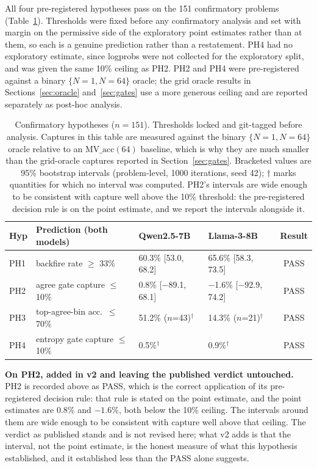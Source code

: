 \documentclass{article}
\begin{document}
All four pre-registered hypotheses pass on the 151 confirmatory problems
(Table~\ref{tab:confirmatory}). Thresholds were fixed before any confirmatory
analysis and set with margin on the permissive side of the exploratory point
estimates rather than at them, so each is a genuine prediction rather than a
restatement. PH4 had no exploratory estimate, since logprobs were not collected
for the exploratory split, and was given the same 10\% ceiling as PH2.
PH2 and PH4 were pre-registered against a binary $\{N=1, N=64\}$ oracle; the
grid oracle results in Sections~\ref{sec:oracle} and~\ref{sec:gates} use a
more generous ceiling and are reported separately as post-hoc analysis.

\begin{table}[t]
\begin{center}
\begin{tabular}{llllc}
\toprule
\textbf{Hyp} & \textbf{Prediction (both models)} & \textbf{Qwen2.5-7B} & \textbf{Llama-3-8B} & \textbf{Result} \\
\midrule
PH1 & backfire rate $\geq$ 33\%          & 60.3\% [53.0, 68.2] & 65.6\% [58.3, 73.5] & PASS \\
PH2 & agree gate capture $\leq$ 10\%   & 0.8\% [$-$89.1, 68.1] & $-$1.6\% [$-$92.9, 74.2] & PASS \\
PH3 & top-agree-bin acc.\ $\leq$ 70\%  & 51.2\% ($n$=43)$^{\dagger}$ & 14.3\% ($n$=21)$^{\dagger}$ & PASS \\
PH4 & entropy gate capture $\leq$ 10\% & 0.5\%$^{\dagger}$    & 0.9\%$^{\dagger}$      & PASS \\
\bottomrule
\end{tabular}
\end{center}
\caption{Confirmatory hypotheses ($n=151$). Thresholds locked and git-tagged
before analysis. Captures in this table are measured against the binary
$\{N=1, N=64\}$ oracle relative to an $\text{MV\_acc}(64)$ baseline, which is
why they are much smaller than the grid-oracle captures reported in
Section~\ref{sec:gates}. Bracketed values are 95\% bootstrap intervals
(problem-level, 1000 iterations, seed 42); $\dagger$ marks quantities for which
no interval was computed. PH2's intervals are wide enough to be consistent with
capture well above the 10\% threshold: the pre-registered decision rule is on
the point estimate, and we report the intervals alongside it.}
\label{tab:confirmatory}
\end{table}

\textbf{On PH2, added in v2 and leaving the published verdict untouched.} PH2
is recorded above as PASS, which is the correct application of its
pre-registered decision rule: that rule is stated on the point estimate, and
the point estimates are 0.8\% and $-1.6\%$, both below the 10\% ceiling. The
intervals around them are wide enough to be consistent with capture well above
that ceiling. The verdict as published stands and is not revised here; what v2
adds is that the interval, not the point estimate, is the honest measure of
what this hypothesis established, and it established less than the PASS alone
suggests.
\end{document}
